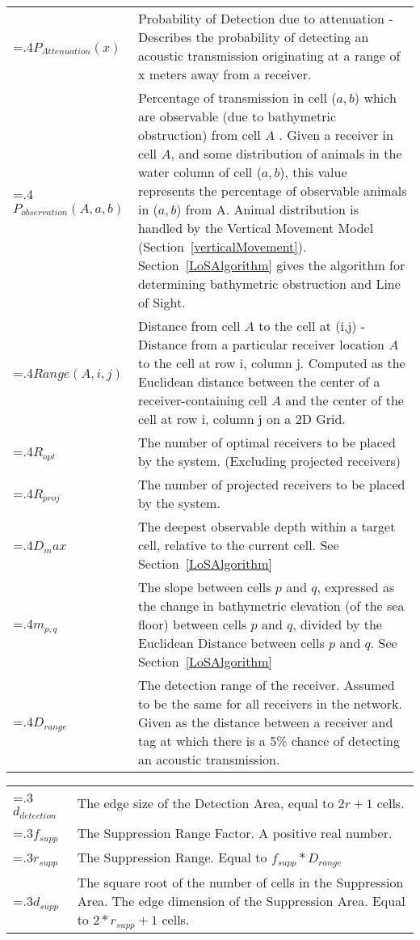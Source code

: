 \begin{tabularx}{\linewidth}{@{}>{\hsize=.4\hsize}X>{\hsize=1.5\hsize}X@{}}
	$P_{Attenuation}(x)$ & Probability of Detection due to attenuation - Describes the probability of detecting an acoustic transmission originating at a range of x meters away from a receiver.\\

	$P_{observation}(A,a,b)$ & Percentage of transmission in cell ($a,b$) which are observable (due to bathymetric obstruction) from cell $A$ .  Given a receiver in cell $A$, and some distribution of animals in the water column of cell ($a,b$), this value represents the percentage of observable animals in ($a,b$) from A.  Animal distribution is handled by the Vertical Movement Model (Section~\ref{verticalMovement}).  Section~\ref{LoSAlgorithm} gives the algorithm for determining bathymetric obstruction and Line of Sight.\\
	
	$Range(A,i,j)$ & Distance from cell $A$ to the cell at (i,j) - Distance from a particular receiver location $A$ to the cell at row i, column j.  Computed as the Euclidean distance between the center of a receiver-containing cell $A$ and the center of the cell at row i, column j on a 2D Grid.\\
	
	$R_{opt}$ & The number of optimal receivers to be placed by the system. (Excluding projected receivers)\\
	
	$R_{proj}$ & The number of projected receivers to be placed by the system.\\
	
	$D_max$& The deepest observable depth within a target cell, relative to the current cell. See Section~\ref{LoSAlgorithm}\\
	
	$m_{p,q}$&The slope between cells $p$ and $q$, expressed as the change in bathymetric elevation (of the sea floor) between cells $p$ and $q$, divided by the Euclidean Distance between cells $p$ and $q$. See Section~\ref{LoSAlgorithm}\\
	
	$D_{range}$ & The detection range of the receiver.  Assumed to be the same for all receivers in the network.  Given as the distance between a receiver and tag at which there is a 5\% chance of detecting an acoustic transmission.\\

\end{tabularx}

\noindent\begin{tabularx}{\linewidth}{@{}>{\hsize=.3\hsize}X>{\hsize=1.5\hsize}X@{}}
	
	$d_{detection}$& The edge size of the Detection Area, equal to $2r+1$ cells.\\
	$f_{supp}$ & The Suppression Range Factor.  A positive real number.\\
	$r_{supp}$ & The Suppression Range. Equal to $f_{supp}*D_{range}$\\
	$d_{supp}$ & The square root of the number of cells in the Suppression Area.  The edge dimension of the Suppression Area.  Equal to $2*r_{supp} + 1$ cells.\\
\end{tabularx}